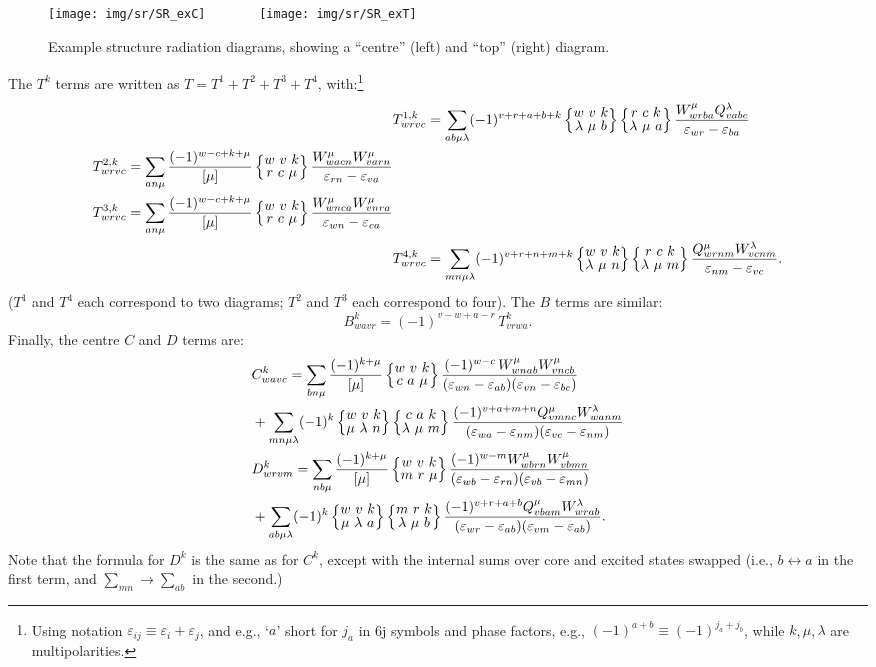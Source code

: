 \documentclass[10pt,twocolumn,a4paper]{article}%
\newcommand{\sixjs}[6]{\renewcommand\arraystretch{0.75}\ensuremath{\begin{Bmatrix}#1~#2~#3\\#4~#5~#6\end{Bmatrix}}}	%
\newcommand{\be}{\begin{equation}}
\newcommand{\ee}{\end{equation}}
\def\en{\ensuremath{\varepsilon}}
\begin{document}
\begin{figure}%
\centering\tiny
\texttt{[image: img/sr/SR\_exC]}~~~~~~~
\texttt{[image: img/sr/SR\_exT]}
\caption{\small Example structure radiation diagrams, showing a ``centre'' (left) and ``top'' (right) diagram.\label{fig:SR-example}}
\end{figure}


The $T^k$ terms are written as
$T=T^1+T^2+T^3+T^4$, with:\footnote{Using notation
$\en_{ij}\equiv\en_i+\en_j$, and e.g., `$a$' short for $j_a$ in 6j symbols and phase factors, e.g.,
$(-1)^{a+b}\equiv(-1)^{j_a + j_b}$, while $k$,\,$\mu$,\,$\lambda$ are multipolarities.}
\begin{align}
&\notag
T^{1,k}_{wrvc} = 
\sum_{ab\mu\lambda}(-1)^{v+r+a+b+k}
\sixjs{w}{v}{k}{\lambda}{\mu}{b}
\sixjs{r}{c}{k}{\lambda}{\mu}{a}
\frac{W^\mu_{wrba}Q^\lambda_{vabc}}{\en_{wr}-\en_{ba}}
\\
\begin{split}
&T^{2,k}_{wrvc} = 
\sum_{an\mu}\frac{(-1)^{w-c+k+\mu}}{[\mu]}
\sixjs{w}{v}{k}{r}{c}{\mu}
\frac{W^\mu_{wacn}W^\mu_{varn}}{\en_{rn}-\en_{va}}
\\
&T^{3,k}_{wrvc} = 
\sum_{an\mu}\frac{(-1)^{w-c+k+\mu}}{[\mu]}
\sixjs{w}{v}{k}{r}{c}{\mu}
\frac{W^\mu_{wnca}W^\mu_{vnra}}{\en_{wn}-\en_{ca}}
\end{split}
\\
&\notag
T^{4,k}_{wrvc} = 
\sum_{mn\mu\lambda}(-1)^{v+r+n+m+k}
\sixjs{w}{v}{k}{\lambda}{\mu}{n}
\sixjs{r}{c}{k}{\lambda}{\mu}{m}
\frac{Q^\mu_{wrnm}W^\lambda_{vcnm}}{\en_{nm}-\en_{vc}}.
\end{align}
($T^1$ and $T^4$ each correspond to two diagrams; $T^2$ and $T^3$ each correspond to four).
The $B$ terms are similar:
\be
B^{k}_{wavr} = (-1)^{v-w+a-r}\,T^{k}_{vrwa}.
\ee
%
Finally, the centre $C$ and $D$ terms are:
\begin{align}
&\notag
C^{k}_{wavc} = 
\sum_{bn\mu}\frac{(-1)^{k+\mu}}{[\mu]}
\sixjs{w}{v}{k}{c}{a}{\mu}
\frac{(-1)^{w-c}\,W^\mu_{wnab}W^\mu_{vncb}}{(\en_{wn}-\en_{ab})(\en_{vn}-\en_{bc})}
\\
&+\sum_{mn\mu\lambda}(-1)^{k}
\sixjs{w}{v}{k}{\mu}{\lambda}{n}
\sixjs{c}{a}{k}{\lambda}{\mu}{m}
\frac{(-1)^{v+a+m+n}Q^\mu_{vmnc}W^\lambda_{wanm}}{(\en_{wa}-\en_{nm})(\en_{vc}-\en_{nm})}
\\
&\notag
D^{k}_{wrvm} = 
\sum_{nb\mu}\frac{(-1)^{k+\mu}}{[\mu]}
\sixjs{w}{v}{k}{m}{r}{\mu}
\frac{(-1)^{w-m}W^\mu_{wbrn}W^\mu_{vbmn}}{(\en_{wb}-\en_{rn})(\en_{vb}-\en_{mn})}
\\
&\notag+
\sum_{ab\mu\lambda}(-1)^{k}
\sixjs{w}{v}{k}{\mu}{\lambda}{a}
\sixjs{m}{r}{k}{\lambda}{\mu}{b}
\frac{(-1)^{v+r+a+b}Q^\mu_{vbam}W^\lambda_{wrab}}{(\en_{wr}-\en_{ab})(\en_{vm}-\en_{ab})}.
\end{align}
Note that the formula for $D^k$ is the same as for $C^k$, except with the internal sums over core and excited states swapped
(i.e., $b\leftrightarrow a$ in the first term, and $\sum_{mn}\to\sum_{ab}$ in the second.)
\end{document}
